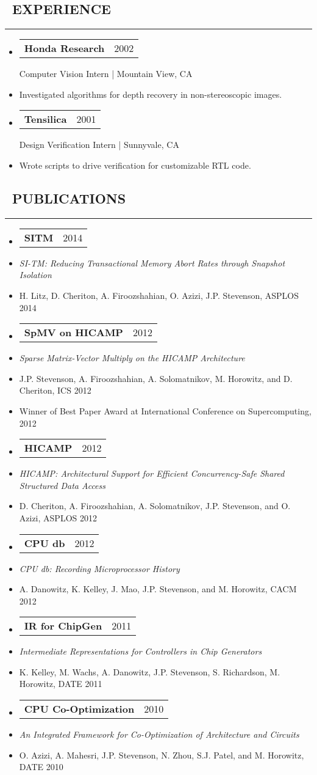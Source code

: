 \documentclass[10pt,letterpaper]{article}
\makeatletter
\newenvironment{resumesection}[1]
{%
    \subsection*{\ \textcolor{light-gray}{#1} }
    \vspace{-0.4em}
    \begin{samepage}
    \hrule
    \end{samepage}
    \vspace{+0.4em}
    \begin{itemize}[leftmargin=0.15cm]
        \parskip=0.1em
}%
{%
    \end{itemize}
}%
\newcommand{\myitem}[1] {
    \item[] \textcolor{dark-gray}{#1}
}
\newcommand{\headerbi}[2] {
    \item[] \begin{tabular*}{\linewidth}{l@{\extracolsep{\fill}}r}
    \textbf{#1} & #2 \\
    \end{tabular*}
}
\newcommand{\headertri}[3] {
    \item[] \begin{tabular*}{\linewidth}{l@{\extracolsep{\fill}}r}
    \textbf{#1} & #2 \\
    \end{tabular*}
    #3
}
\newcommand{\lminiw}{0.375}
\newcommand{\cminiw}{0.075}
\newcommand{\rminiw}{0.550}
\makeatother
\begin{document}
\begin{minipage}[t]{\rminiw\textwidth}
\begin{resumesection}{EXPERIENCE}
    \headertri
    {Honda Research}
    {2002}
    {Computer Vision Intern | Mountain View, CA}
    \myitem{Investigated algorithms for depth recovery in non-stereoscopic images.}

    \headertri
    {Tensilica}
    {2001}
    {Design Verification Intern | Sunnyvale, CA}
    \myitem{Wrote scripts to drive verification for customizable RTL code.}
\end{resumesection}

\end{minipage}

\newpage

\begin{minipage}[t]{\lminiw\textwidth}
\begin{resumesection}{PUBLICATIONS}
    \headerbi{SITM}{2014}
    \myitem{\textit{SI-TM: Reducing Transactional Memory Abort Rates through Snapshot Isolation}}
    \myitem{H. Litz, D. Cheriton, A. Firoozshahian, O. Azizi, J.P. Stevenson, ASPLOS 2014}
    \headerbi{SpMV on HICAMP}{2012}
    \myitem{\textit{Sparse Matrix-Vector Multiply on the HICAMP Architecture}}
    \myitem{J.P. Stevenson, A. Firoozshahian, A. Solomatnikov, M. Horowitz, and D. Cheriton, ICS 2012}
    \myitem{Winner of Best Paper Award at International Conference on Supercomputing, 2012}
    \headerbi{HICAMP}{2012}
    \myitem{\textit{HICAMP: Architectural Support for Efficient Concurrency-Safe Shared Structured Data Access}}
    \myitem{D. Cheriton, A. Firoozshahian, A. Solomatnikov, J.P. Stevenson, and O. Azizi, ASPLOS 2012}
    \headerbi{CPU db}{2012}
    \myitem{\textit{CPU db: Recording Microprocessor History}}
    \myitem{A. Danowitz, K. Kelley, J. Mao, J.P. Stevenson, and M. Horowitz, CACM 2012}
    \headerbi{IR for ChipGen}{2011}
    \myitem{\textit{Intermediate Representations for Controllers in Chip Generators}}
    \myitem{K. Kelley, M. Wachs, A. Danowitz, J.P. Stevenson, S. Richardson, M. Horowitz, DATE 2011}
    \headerbi{CPU Co-Optimization}{2010}
    \myitem{\textit{An Integrated Framework for Co-Optimization of Architecture and Circuits}}
    \myitem{O. Azizi, A. Mahesri, J.P. Stevenson, N. Zhou, S.J. Patel, and M. Horowitz, DATE 2010}
\end{resumesection}
\end{minipage}
\begin{minipage}[t]{\cminiw\textwidth}
\end{minipage}
\end{document}
